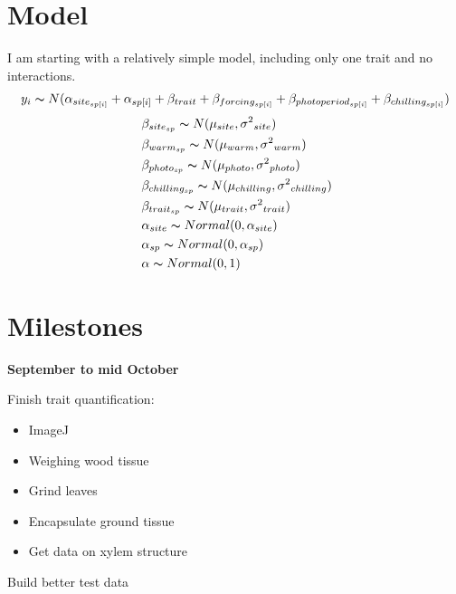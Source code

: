 \documentclass[11pt,a4paper,oneside]{article}
\begin{document}
\section*{Model}

I am starting with a relatively simple model, including only one trait and no interactions. 
\begin{align*}
y_i \thicksim N(\alpha_{site_{sp[i]}} +\alpha_{sp[i]} + \beta_{trait}+ \beta_{forcing_{sp[i]}} + \beta_{photoperiod_{sp[i]}} + \beta_{chilling_{sp[i]}})
\end{align*}
\begin{align*}
& \; \beta_{site_{sp}} \thicksim N(\mu_{site}, \sigma{^2}_{site}) \\
& \; \beta_{warm_{sp}} \thicksim N(\mu_{warm}, \sigma{^2}_{warm}) \\
& \; \beta_{photo_{sp}} \thicksim N(\mu_{photo}, \sigma{^2}_{photo}) \\
& \; \beta_{chilling_{sp}} \thicksim N(\mu_{chilling}, \sigma{^2}_{chilling}) \\
& \; \beta_{trait_{sp}} \thicksim N(\mu_{trait}, \sigma{^2}_{trait}) \\
& \; \alpha_{site} \thicksim Normal (0,\alpha_{site})\\
& \; \alpha_{sp} \thicksim Normal (0,\alpha_{sp})\\
& \; \alpha \thicksim Normal (0,1)\\
\end{align*}

\section*{Milestones}

\textbf{September to mid October}
\par Finish trait quantification:
\begin{itemize}
\item ImageJ
\item Weighing wood tissue
\item Grind leaves
\item Encapsulate ground tissue
\item Get data on xylem structure 
\end{itemize}
\par Build better test data
\end{document}
